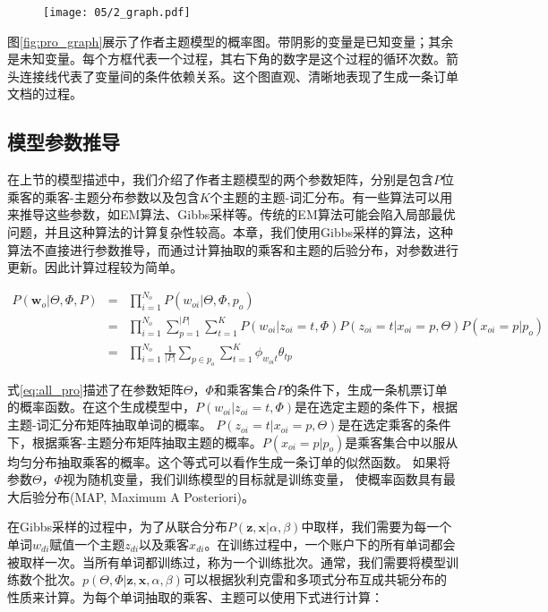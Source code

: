 \begin{figure}[!h]
 \centering
 \texttt{[image: 05/2\_graph.pdf]}
\end{figure}

图\ref{fig:pro_graph}展示了作者主题模型的概率图。带阴影的变量是已知变量；其余是未知变量。每个方框代表一个过程，其右下角的数字是这个过程的循环次数。箭头连接线代表了变量间的条件依赖关系。这个图直观、清晰地表现了生成一条订单文档的过程。

\subsection{模型参数推导}
在上节的模型描述中，我们介绍了作者主题模型的两个参数矩阵，分别是包含$P$位乘客的乘客-主题分布参数以及包含$K$个主题的主题-词汇分布。有一些算法可以用来推导这些参数，如EM算法、Gibbs采样\parencite{george1993variable}等。传统的EM算法可能会陷入局部最优问题，并且这种算法的计算复杂性较高。本章，我们使用Gibbs采样的算法，这种算法不直接进行参数推导，而通过计算抽取的乘客和主题的后验分布，对参数进行更新。因此计算过程较为简单。


\begin{eqnarray}
\label{eq:all_pro}
P(\mathbf{w}_o | \Theta,\Phi,P) & = & \prod_{i=1}^{N_o}P(w_{oi}|\Theta,\Phi,p_o) 
\nonumber \\
 & = & \prod_{i=1}^{N_o}\sum_{p=1}^{|P|}\sum_{t=1}^{K}P(w_{oi}|z_{oi}=t,\Phi)
P(z_{oi}=t|x_{oi}=p,\Theta)P(x_{oi}=p|p_o) \nonumber \\
 & = & \prod_{i=1}^{N_o}\frac{1}{|P|}\sum_{p \in p_o}\sum_{t=1}^{K}\phi_{w_{oi}t}\theta_{tp}
\end{eqnarray}


式\ref{eq:all_pro}描述了在参数矩阵$\Theta$，$\Phi$和乘客集合$P$的条件下，生成一条机票订单的概率函数。在这个生成模型中，$P(w_{oi}|z_{oi}=t,\Phi)$是在选定主题的条件下，根据主题-词汇分布矩阵抽取单词的概率。
$P(z_{oi}=t|x_{oi}=p,\Theta)$是在选定乘客的条件下，根据乘客-主题分布矩阵抽取主题的概率。$P(x_{oi}=p|p_o)$是乘客集合中以服从均匀分布抽取乘客的概率。这个等式可以看作生成一条订单的似然函数。
如果将参数$\Theta$，$\Phi$视为随机变量，我们训练模型的目标就是训练变量，
使概率函数具有最大后验分布(MAP, Maximum A Posteriori)。 

在Gibbs采样的过程中，为了从联合分布$P(\mathbf{z},\mathbf{x}|\alpha,\beta)$中取样，我们需要为每一个单词$w_{di}$赋值一个主题$z_{di}$以及乘客$x_{di}$。在训练过程中，一个账户下的所有单词都会被取样一次。当所有单词都训练过，称为一个训练批次。通常，我们需要将模型训练数个批次。$p(\Theta,\Phi|\mathbf{z},\mathbf{x},\alpha,\beta)$可以根据狄利克雷和多项式分布互成共轭分布的性质来计算。为每个单词抽取的乘客、主题可以使用下式进行计算：

